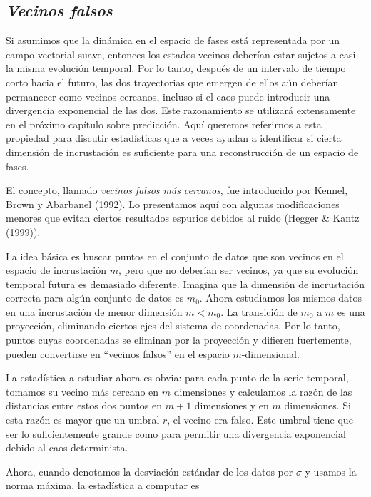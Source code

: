 \documentclass[10pt,a4paper]{book}
\begin{document}
\newpage

\subsection{\textit{Vecinos falsos}}

Si asumimos que la dinámica en el espacio de fases está representada por un campo vectorial suave, entonces los estados vecinos deberían estar sujetos a casi la misma evolución temporal. Por lo tanto, después de un intervalo de tiempo corto hacia el futuro, las dos trayectorias que emergen de ellos aún deberían permanecer como vecinos cercanos, incluso si el caos puede introducir una divergencia exponencial de las dos. Este razonamiento se utilizará extensamente en el próximo capítulo sobre predicción. Aquí queremos referirnos a esta propiedad para discutir estadísticas que a veces ayudan a identificar si cierta dimensión de incrustación es suficiente para una reconstrucción de un espacio de fases.

El concepto, llamado \textit{vecinos falsos más cercanos}, fue introducido por Kennel, Brown y Abarbanel (1992). Lo presentamos aquí con algunas modificaciones menores que evitan ciertos resultados espurios debidos al ruido (Hegger \& Kantz (1999)).

La idea básica es buscar puntos en el conjunto de datos que son vecinos en el espacio de incrustación $m$, pero que no deberían ser vecinos, ya que su evolución temporal futura es demasiado diferente. Imagina que la dimensión de incrustación correcta para algún conjunto de datos es $m_0$. Ahora estudiamos los mismos datos en una incrustación de menor dimensión $m < m_0$. La transición de $m_0$ a $m$ es una proyección, eliminando ciertos ejes del sistema de coordenadas. Por lo tanto, puntos cuyas coordenadas se eliminan por la proyección y difieren fuertemente, pueden convertirse en “vecinos falsos” en el espacio $m$-dimensional.  

La estadística a estudiar ahora es obvia: para cada punto de la serie temporal, tomamos su vecino más cercano en $m$ dimensiones y calculamos la razón de las distancias entre estos dos puntos en $m+1$ dimensiones y en $m$ dimensiones. Si esta razón es mayor que un umbral $r$, el vecino era falso. Este umbral tiene que ser lo suficientemente grande como para permitir una divergencia exponencial debido al caos determinista.

Ahora, cuando denotamos la desviación estándar de los datos por $\sigma$ y usamos la norma máxima, la estadística a computar es
\end{document}
